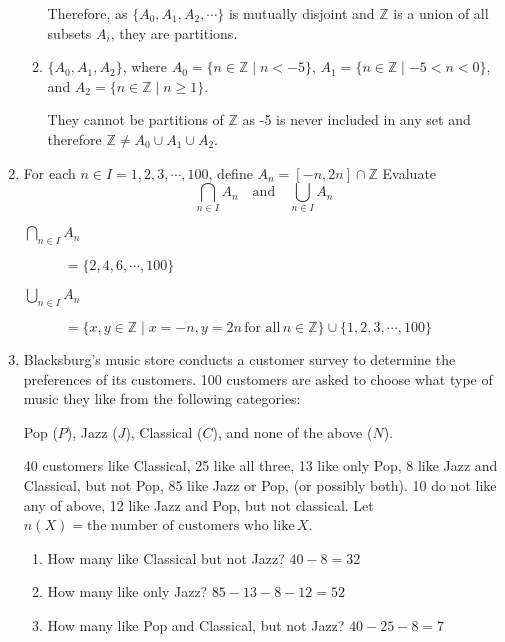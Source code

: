\documentclass[12pt,letterpaper,titlepage]{article}
\begin{document}
\begin{raggedright}
\begin{enumerate}
\begin{enumerate}[label=(\alph*)]
Therefore, as $\{A_0, A_1, A_2, \cdots\}$ is mutually disjoint and $\mathbb{Z}$ is a union of all subsets $A_i$, they are partitions.


\item $\{A_0, A_1, A_2\}$, where $A_0 = \{n\in\mathbb{Z}\mid n < -5\}$, $A_1 = \{n\in\mathbb{Z}\mid -5 < n < 0\}$, and $A_2 = \{n\in\mathbb{Z}\mid n \geq 1\}$.

They cannot be partitions of $\mathbb{Z}$ as -5 is never included in any set and therefore $\mathbb{Z} \neq A_0\cup A_1\cup A_2$.

\end{enumerate}

\item For each $n\in I = {1,2,3,\cdots, 100}$, define $A_n = [-n, 2n]\cap\mathbb{Z}$ Evaluate
\begin{equation}
\bigcap_{n\in I} A_n\quad\text{and}\quad\bigcup_{n\in I} A_n
\end{equation}

\begin{description}
\item[$\bigcap_{n\in I} A_n$] $= \{2, 4, 6, \cdots, 100\}$
\item[$\bigcup_{n\in I} A_n$] $= \{x, y \in \mathbb{Z}\mid x=-n, y=2n\, \text{for all}\, n\in\mathbb{Z}\}\cup \{1,2,3,\cdots,100\}$
\end{description}

\clearpage

\item Blacksburg’s music store conducts a customer survey to determine the preferences of its customers. 100 customers are asked to choose what type of music they like from the following categories:
\begin{center}
Pop ($P$), Jazz ($J$), Classical ($C$), and none of the above ($N$).
\end{center}

40 customers like Classical, 25 like all three, 13 like only Pop, 8 like Jazz and Classical, but not Pop, 85 like Jazz or Pop, (or possibly both). 10 do not like any of above, 12 like Jazz and Pop, but not classical. Let $n(X)= \text{the number of customers who like}\, X$.

\begin{enumerate}[label=(\alph*)]
\item How many like Classical but not Jazz? $40-8=32$
\item How many like only Jazz? $85-13-8-12 = 52$
\item How many like Pop and Classical, but not Jazz? $40-25-8=7$
\end{enumerate}
\end{enumerate}


\end{raggedright}
\end{document}
